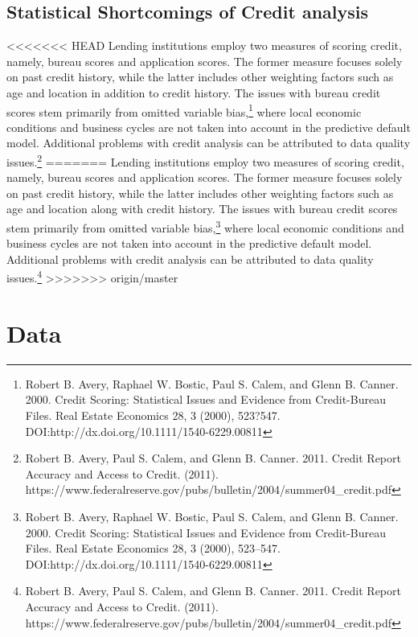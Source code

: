 \documentclass[sigconf, 11pt]{acmart}
\begin{document}
\subsection{Statistical Shortcomings of Credit analysis}
<<<<<<< HEAD
Lending institutions employ two measures of scoring credit, namely, bureau scores and application scores. The former measure focuses solely on past credit history, while the latter includes other weighting factors such as age and location in addition to credit history. The issues with bureau credit scores stem primarily from omitted variable bias,\footnote{Robert B. Avery, Raphael W. Bostic, Paul S. Calem, and Glenn B. Canner. 2000. Credit Scoring: Statistical Issues and Evidence from Credit-Bureau Files. Real Estate Economics 28, 3 (2000), 523?547. DOI:http://dx.doi.org/10.1111/1540-6229.00811} where local economic conditions and business cycles are not taken into account in the predictive default model. Additional problems with credit analysis can be attributed to data quality issues.\footnote{Robert B. Avery, Paul S. Calem, and Glenn B. Canner. 2011. Credit Report Accuracy and Access to Credit. (2011). https://www.federalreserve.gov/pubs/bulletin/2004/summer04\_credit.pdf}
=======
Lending institutions employ two measures of scoring credit, namely, bureau scores and application scores. The former measure focuses solely on past credit history, while the latter includes other weighting factors such as age and location along with credit history. The issues with bureau credit scores stem primarily from omitted variable bias,\footnote{Robert B. Avery, Raphael W. Bostic, Paul S. Calem, and Glenn B. Canner. 2000. Credit Scoring: Statistical Issues and Evidence from Credit-Bureau Files. Real Estate Economics 28, 3 (2000), 523–547. DOI:http://dx.doi.org/10.1111/1540-6229.00811} where local economic conditions and business cycles are not taken into account in the predictive default model. Additional problems with credit analysis can be attributed to data quality issues.\footnote{Robert B. Avery, Paul S. Calem, and Glenn B. Canner. 2011. Credit Report Accuracy and Access to Credit. (2011). https://www.federalreserve.gov/pubs/bulletin/2004/summer04\_credit.pdf}
>>>>>>> origin/master

\section{Data}
\end{document}
